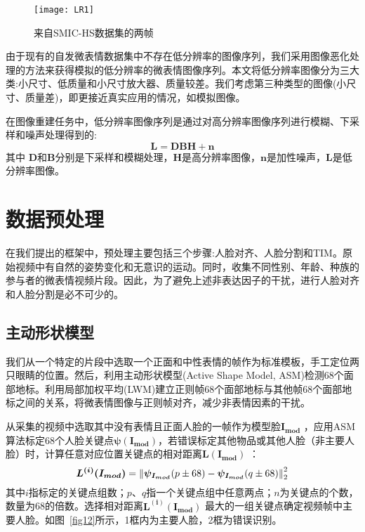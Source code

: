 \begin{figure}[!htbp]
\centering
\texttt{[image: LR1]}
\caption{来自SMIC-HS数据集的两帧}
\label{fig11}
\end{figure}

由于现有的自发微表情数据集中不存在低分辨率的图像序列，我们采用图像恶化处理的方法来获得模拟的低分辨率的微表情图像序列。本文将低分辨率图像分为三大类:小尺寸、低质量和小尺寸放大器、质量较差\citep{wang2014low}。我们考虑第三种类型的图像(小尺寸、质量差)，即更接近真实应用的情况，如模拟图像。

在图像重建任务中，低分辨率图像序列是通过对高分辨率图像序列进行模糊、下采样和噪声处理得到的\citep{shi2018hallucinating}:
\begin{equation}
    \label{eq1}
    \boldsymbol{L} = \boldsymbol{DBH}+\boldsymbol{n}
\end{equation}
其中 $\boldsymbol{D}$和$\boldsymbol{B}$分别是下采样和模糊处理，$\boldsymbol{H}$是高分辨率图像，$\boldsymbol{n}$是加性噪声，$\boldsymbol{L}$是低分辨率图像。

\section{数据预处理}

在我们提出的框架中，预处理主要包括三个步骤:人脸对齐、人脸分割和TIM。原始视频中有自然的姿势变化和无意识的运动。同时，收集不同性别、年龄、种族的参与者的微表情视频片段。因此，为了避免上述非表达因子的干扰，进行人脸对齐和人脸分割是必不可少的。

\subsection{主动形状模型}

我们从一个特定的片段中选取一个正面和中性表情的帧作为标准模板，手工定位两只眼睛的位置。然后，利用主动形状模型(Active Shape Model, ASM)检测68个面部地标\citep{cootes1995active}。利用局部加权平均(LWM)建立正则帧68个面部地标与其他帧68个面部地标之间的关系，将微表情图像与正则帧对齐，减少非表情因素的干扰\citep{goshtasby1988image}。

从采集的视频中选取其中没有表情且正面人脸的一帧作为模型脸$\boldsymbol{I_{mod}}$ ，应用ASM算法标定68个人脸关键点$\boldsymbol{\psi(I_{mod})}$，若错误标定其他物品或其他人脸（非主要人脸）时，计算任意对应位置关键点的相对距离$\boldsymbol{L(I_{mod})}$ ：
\begin{equation}
    \label{eq2}
    \boldsymbol{L^{(i)}(I_{mod})}=\left \| \boldsymbol{\psi_{I_{mod}}}(p\pm 68)-\boldsymbol{\psi_{I_{mod}}}(q\pm 68) \right \|_{2}^{2\displaystyle }
\end{equation}
其中$i$指标定的关键点组数；$p$、$q$指一个关键点组中任意两点；$n$为关键点的个数，数量为68的倍数。选择相对距离$\boldsymbol{L^{(i)}(I_{mod})}$ 最大的一组关键点确定视频帧中主要人脸。如图~\ref{fig12}所示，1框内为主要人脸，2框为错误识别。

